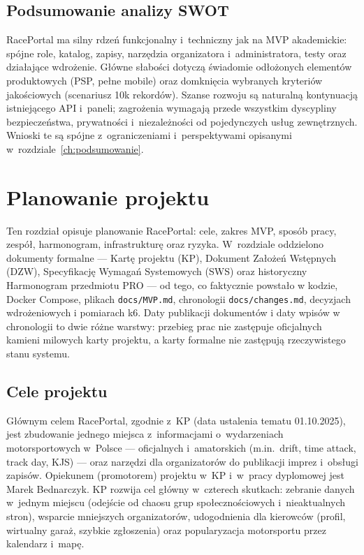 \documentclass{sprz}
\begin{document}
\section{Podsumowanie analizy SWOT}
RacePortal ma silny rdzeń funkcjonalny i~techniczny jak na MVP akademickie: spójne role, katalog, zapisy, narzędzia organizatora i~administratora, testy oraz działające wdrożenie. Główne słabości dotyczą świadomie odłożonych elementów produktowych (PSP, pełne mobile) oraz domknięcia wybranych kryteriów jakościowych (scenariusz 10k rekordów). Szanse rozwoju są naturalną kontynuacją istniejącego API i~paneli; zagrożenia wymagają przede wszystkim dyscypliny bezpieczeństwa, prywatności i~niezależności od pojedynczych usług zewnętrznych. Wnioski te są spójne z~ograniczeniami i~perspektywami opisanymi w~rozdziale~\ref{ch:podsumowanie}.

\chapter{Planowanie projektu}
\label{ch:planowanie}

Ten rozdział opisuje planowanie RacePortal: cele, zakres MVP, sposób pracy, zespół, harmonogram, infrastrukturę oraz ryzyka. W~rozdziale oddzielono dokumenty formalne --- Kartę projektu (KP), Dokument Założeń Wstępnych (DZW), Specyfikację Wymagań Systemowych (SWS) oraz historyczny Harmonogram przedmiotu PRO --- od tego, co faktycznie powstało w kodzie, Docker Compose, plikach \texttt{docs/\allowbreak MVP.md}, chronologii \texttt{docs/\allowbreak changes.md}, decyzjach wdrożeniowych i pomiarach k6. Daty publikacji dokumentów i daty wpisów w chronologii to dwie różne warstwy: przebieg prac nie zastępuje oficjalnych kamieni milowych karty projektu, a karty formalne nie zastępują rzeczywistego stanu systemu.

\section{Cele projektu}

Głównym celem RacePortal, zgodnie z~KP
(data ustalenia tematu 01.10.2025),
jest zbudowanie jednego miejsca z~informacjami
o~wydarzeniach motorsportowych w~Polsce --- oficjalnych i~amatorskich
(m.in.\ drift, time attack, track day, KJS) ---
oraz narzędzi dla organizatorów do publikacji imprez i~obsługi zapisów. Opiekunem (promotorem) projektu w~KP i~w~pracy dyplomowej jest Marek Bednarczyk. KP rozwija cel główny w~czterech skutkach: zebranie danych w~jednym miejscu (odejście od chaosu grup społecznościowych i~nieaktualnych stron), wsparcie mniejszych organizatorów, udogodnienia dla kierowców (profil, wirtualny garaż, szybkie zgłoszenia) oraz popularyzacja motorsportu przez kalendarz i~mapę.
\end{document}
